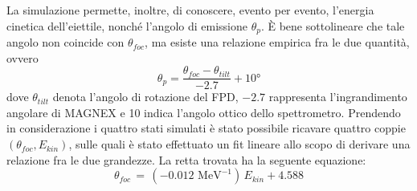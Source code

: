 La simulazione permette, inoltre, di conoscere, evento per evento, l'energia cinetica dell'eiettile, nonché l'angolo di emissione $\theta_{p}$.
È bene sottolineare che tale angolo non coincide con $\theta_{foc}$, ma esiste una relazione empirica fra le due quantità, ovvero
\begin{equation}
	\theta_{p} = \frac{\theta_{foc} - \theta_{tilt}}{-2.7} + \ang{10}
\end{equation}
dove $\theta_{tilt}$ denota l'angolo di rotazione del FPD, $-2.7$ rappresenta l'ingrandimento angolare di MAGNEX e 10\textdegree{} indica l'angolo ottico dello spettrometro.
Prendendo in considerazione i quattro stati simulati è stato possibile ricavare quattro coppie $(\theta_{foc} , E_{kin})$, sulle quali è stato effettuato un fit lineare allo scopo di derivare una relazione fra le due grandezze.
La retta trovata ha la seguente equazione:
\begin{equation} \label{eq:correlazione_angolo_energia}
	\theta_{foc} \, = \, (-0.012 \mbox{ MeV}^{-1} )\, E_{kin} + 4.588
\end{equation}

